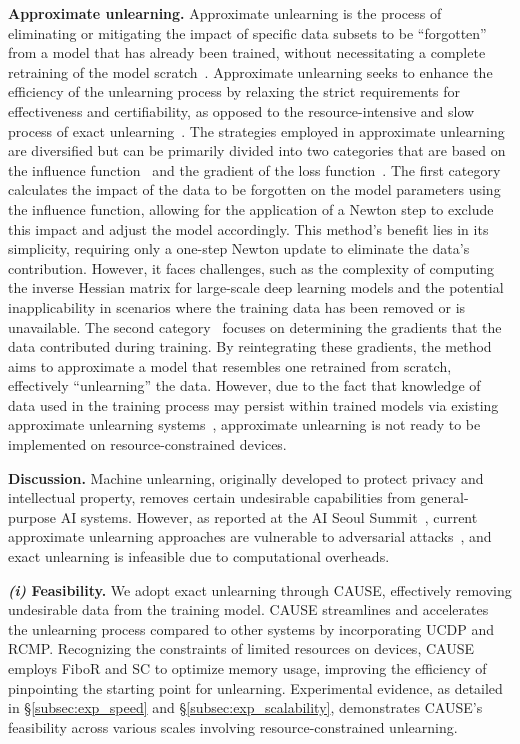 \documentclass[conference,compsoc]{IEEEtran}
\begin{document}
\noindent \textbf{Approximate unlearning.} 
Approximate unlearning is the process of eliminating or mitigating the impact of specific data subsets to be ``forgotten'' from a model that has already been trained, without necessitating a complete retraining of the model scratch~\cite{xu2024machine}. Approximate unlearning seeks to enhance the efficiency of the unlearning process by relaxing the strict requirements for effectiveness and certifiability, as opposed to the resource-intensive and slow process of exact unlearning~\cite{thudi2022necessity}. The strategies employed in approximate unlearning are diversified but can be primarily divided into two categories that are based on the influence function~\cite{guo2019certified,izzo2021approximate} and the gradient of the loss function~\cite{neel2021descent,wu2020deltagrad,thudi2022unrolling}. The first category~\cite{guo2019certified, izzo2021approximate} calculates the impact of the data to be forgotten on the model parameters using the influence function, allowing for the application of a Newton step to exclude this impact and adjust the model accordingly. This method's benefit lies in its simplicity, requiring only a one-step Newton update to eliminate the data's contribution. However, it faces challenges, such as the complexity of computing the inverse Hessian matrix for large-scale deep learning models and the potential inapplicability in scenarios where the training data has been removed or is unavailable. The second category~\cite{neel2021descent,wu2020deltagrad,thudi2022unrolling} focuses on determining the gradients that the data contributed during training. By reintegrating these gradients, the method aims to approximate a model that resembles one retrained from scratch, effectively ``unlearning'' the data. 
However, due to the fact that knowledge of data used in the training process may persist within trained models via existing approximate unlearning systems~\cite{maini2024tofu}, approximate unlearning is not ready to be implemented on resource-constrained devices. 


\noindent \textbf{{Discussion.}}
Machine unlearning, originally developed to protect privacy and intellectual property, removes certain undesirable capabilities from general-purpose AI systems. However, as reported at the AI Seoul Summit~\cite{bengio2024international}, current approximate unlearning approaches are vulnerable to adversarial attacks~\cite{hu2024duty, hu2024learn}, and exact unlearning is infeasible due to computational overheads.

\noindent \textbf{\textit{(i)} Feasibility.} We adopt exact unlearning through CAUSE, effectively removing undesirable data from the training model. CAUSE streamlines and accelerates the unlearning process compared to other systems by incorporating UCDP and RCMP. Recognizing the constraints of limited resources on devices, CAUSE employs FiboR and SC to optimize memory usage, improving the efficiency of pinpointing the starting point for unlearning. Experimental evidence, as detailed in \S\ref{subsec:exp_speed} and \S\ref{subsec:exp_scalability}, demonstrates CAUSE's feasibility across various scales involving resource-constrained unlearning.
\end{document}
